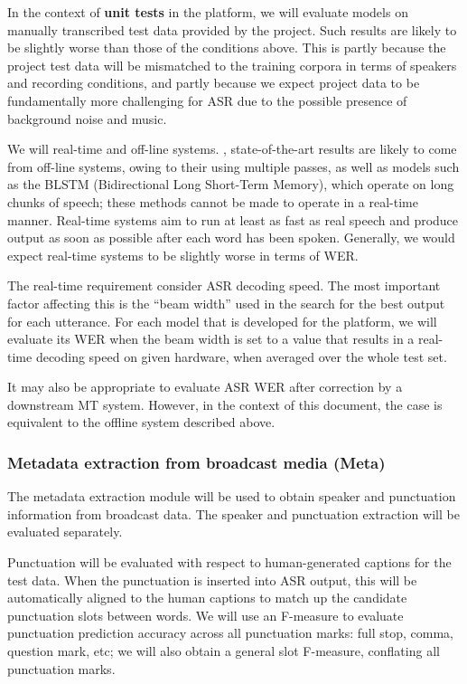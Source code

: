 In the context of \textbf{unit tests} in the \SUMMA platform, we will  evaluate models on manually transcribed test data provided by the project.  Such results are likely to be slightly worse than those of the conditions above.  This is partly because the project test data will be mismatched to the training corpora in terms of speakers and recording conditions, and partly because we expect project data to be fundamentally more challenging for ASR due to the possible presence of background noise and music.

We will  real-time and off-line systems.  , state-of-the-art results are likely to come from off-line systems, owing to their using multiple passes, as well as models such as the  BLSTM (Bidirectional Long Short-Term Memory), which operate on long chunks of speech;  these methods cannot be made to operate in a real-time manner.  Real-time systems aim to run at least as fast as real speech and produce output as soon as possible after each word has been spoken.  Generally, we would expect real-time systems to be slightly worse in terms of WER.

The real-time requirement  consider ASR decoding speed.  The most important factor affecting this is the ``beam width'' used in the search for the best output for each utterance.  For each model that is developed for the \SUMMA platform, we will evaluate its WER when the beam width is set to a value that results in a real-time decoding speed on given hardware, when averaged over the whole test set. 

It may also be appropriate to evaluate ASR WER after correction by a downstream MT system. However, in the context of this document, the case is equivalent to the offline system described above.

\subsubsection{Metadata extraction from broadcast media (Meta)}

The metadata extraction module will be used to obtain speaker and punctuation information from broadcast data.  The 
speaker and punctuation extraction will be evaluated separately.  

Punctuation will be evaluated with respect to human-generated captions for the \SUMMA test data.  When the punctuation is inserted into ASR output, this will be automatically aligned to the human captions to match up the candidate punctuation slots between words.  
We will use an F-measure to evaluate punctuation prediction accuracy across all punctuation marks: full stop, comma, question mark, etc; we will also obtain a general slot F-measure, conflating all punctuation marks.

